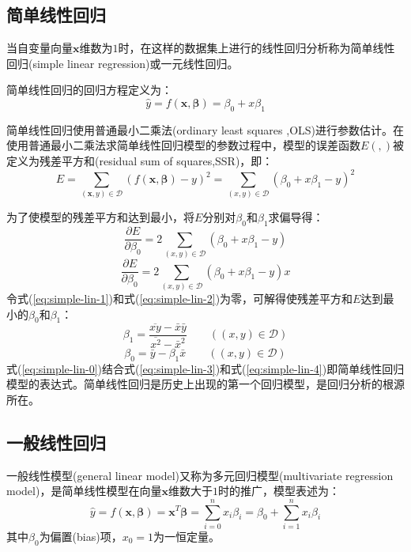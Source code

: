 \documentclass[a4paper]{ctexart}
\begin{document}
\begin{spacing}{1.3}
	\subsection{简单线性回归}
	当自变量向量$\bm{x}$维数为$1$时，在这样的数据集上进行的线性回归分析称为简单线性回归(simple linear regression)或一元线性回归。
	
	简单线性回归的回归方程定义为：
	\begin{equation}\label{eq:simple-lin-0}
	\hat{y}=f(\bm{x},\bm{\beta})=\beta_{0}+x\beta_{1}
	\end{equation}
	
	简单线性回归使用普通最小二乘法(ordinary least squares ,OLS)进行参数估计。在使用普通最小二乘法求简单线性回归模型的参数过程中，模型的误差函数$E(,)$被定义为残差平方和(residual sum of squares,SSR)，即：
	\begin{equation}
	E=\sum_{(\bm{x},y)\in \mathcal{D}}(f(\bm{x},\bm{\beta})-y)^{2}=\sum_{(x,y)\in \mathcal{D}}(\beta_{0}+x\beta_{1}-y)^{2}
	\end{equation}
	
	为了使模型的残差平方和达到最小，将$E$分别对$\beta_{0}$和$\beta_{1}$求偏导得：
	\begin{equation}\label{eq:simple-lin-1}
	\frac{\partial E}{\partial \beta_{0}}=2\sum_{(x,y)\in \mathcal{D}}\left(\beta_{0}+x\beta_{1}-y\right)
	\end{equation}
	\begin{equation}\label{eq:simple-lin-2}
	\frac{\partial E}{\partial \beta_{0}}=2\sum_{(x,y)\in \mathcal{D}}\left(\beta_{0}+x\beta_{1}-y\right)x
	\end{equation}
	令式(\ref{eq:simple-lin-1})和式(\ref{eq:simple-lin-2})为零，可解得使残差平方和$E$达到最小的$\beta_{0}$和$\beta_{1}$：
	\begin{equation}\label{eq:simple-lin-3}
	\beta_{1}=\frac{\overline{xy}-\bar{x}\bar{y}}{\overline{x^2}-\bar{x}^2}\qquad
	((x,y)\in \mathcal{D})
	\end{equation}
	\begin{equation}\label{eq:simple-lin-4}
	\beta_{0}=\bar{y}-\beta_{1}\bar{x}\qquad
	((x,y)\in \mathcal{D})
	\end{equation}
	式(\ref{eq:simple-lin-0})结合式(\ref{eq:simple-lin-3})和式(\ref{eq:simple-lin-4})即简单线性回归模型的表达式。简单线性回归是历史上出现的第一个回归模型，是回归分析的根源所在。
	
	\subsection{一般线性回归}\label{sec:normal-lin}
	一般线性模型(general linear model)又称为多元回归模型(multivariate regression model)，是简单线性模型在向量$\bm{x}$维数大于$1$时的推广，模型表述为：
	\begin{equation}\label{eq:normal-lin-0}
	\hat{y}=f(\bm{x},\bm{\beta})=\bm{x}^T\bm{\beta}=\sum_{i=0}^n x_i\beta_i=\beta_{0}+\sum_{i=1}^n x_i\beta_i
	\end{equation}
	其中$\beta_{0}$为偏置(bias)项，$x_0=1$为一恒定量。
	

\end{spacing}
\end{document}
